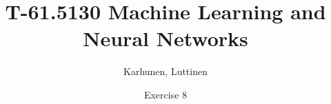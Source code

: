
\title{T-61.5130 Machine Learning and Neural Networks}
\author{Karhunen, Luttinen}
\date{Exercise 8}

\newcommand{\vect}[1]{{\bf{#1}}}
\newcommand{\svect}[1]{\boldsymbol{#1}}
\newcommand{\matr}[1]{\boldsymbol{#1}}

\renewcommand{\vec}[1]{\mathbf{#1}}
\newcommand{\set}[1]{\mathcal{#1}}
\newcommand{\C}{\set{C}}
\newcommand{\E}{\mathcal{E}}
\newcommand{\I}{\vec{I}}
\renewcommand{\L}{\mathcal{L}}
\newcommand{\N}{\mathrm{I \negmedspace N}}
\newcommand{\R}{\mathrm{I \negmedspace R}}
\newcommand{\V}{\set{V}}
\newcommand{\W}{\vec{W}}
\newcommand{\X}{\set{X}}
\newcommand{\e}{\vec{e}}
\newcommand{\h}{\vec{h}}
\newcommand{\m}{\vec{m}}
\newcommand{\mub}{\boldsymbol{\mu}}
\newcommand{\n}{\vec{n}}
\renewcommand{\t}{\vec{t}}
\renewcommand{\u}{\vec{u}}
\renewcommand{\v}{\vec{v}}
\newcommand{\w}{\vec{w}}
\newcommand{\x}{\vec{x}}
\newcommand{\y}{\vec{y}}
\newcommand{\Y}{\vec{Y}}
\newcommand{\z}{\vec{z}}
\newcommand{\argmin}{\operatornamewithlimits{argmin}}
\newcommand{\argmax}{\operatornamewithlimits{argmax}}




\maketitle

